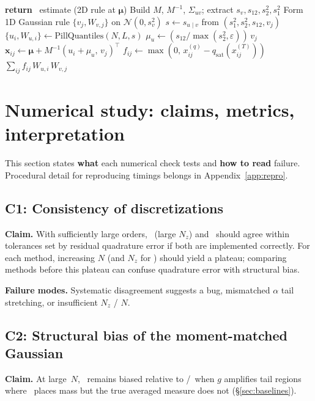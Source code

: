 \documentclass[11pt,a4paper]{article}
\begin{document}
\begin{algorithm}[H]
\caption{Profile--Rosenblatt quadrature for $\overline{q_c}$ (schematic)}
\label{alg:profros}
\begin{algorithmic}[1]
\IF{$\|\nabla\phi\|<\varepsilon$}
  \STATE \textbf{return} \centeronly\ estimate (2D rule at $\boldsymbol{\mu}$)
\ENDIF
\STATE Build $M$, $M^{-1}$, $\Sigma_{uv}$; extract $s_v,s_{12},s_2^2,s_1^2$
\STATE Form 1D Gaussian rule $\{v_j,W_{v,j}\}$ on $\mathcal{N}(0,s_v^2)$
  \STATE $s \gets s_{u\mid v}$ from $(s_1^2,s_2^2,s_{12},v_j)$
  \STATE $\{u_i,W_{u,i}\} \gets \mathrm{PillQuantiles}(N,L,s)$ 
  \STATE $\mu_u \gets (s_{12}/\max(s_2^2,\varepsilon))\,v_j$
    \STATE $\mathbf{x}_{ij}\gets \boldsymbol{\mu}+M^{-1}(u_i+\mu_u,\,v_j)^\top$
    \STATE $f_{ij}\gets \max(0,\,x^{(q)}_{ij}-q_{\mathrm{sat}}(x^{(T)}_{ij}))$
  \ENDFOR
\ENDFOR
\STATE \RETURN $\sum_{ij} f_{ij}\,W_{u,i}\,W_{v,j}$
\end{algorithmic}
\end{algorithm}

\section{Numerical study: claims, metrics, interpretation}
\label{sec:validation}

This section states \textbf{what} each numerical check tests and \textbf{how to read} failure.
Procedural detail for reproducing timings belongs in Appendix~\ref{app:repro}.

\subsection{C1: Consistency of discretizations}
\textbf{Claim.}
With sufficiently large orders, \columntensor\ (large $N_z$) and \profileros\ should agree within tolerances set by residual quadrature error if both are implemented correctly.
For each method, increasing $N$ (and $N_z$ for \columntensor) should yield a plateau; comparing methods before this plateau can confuse quadrature error with structural bias.

\textbf{Failure modes.}
Systematic disagreement suggests a bug, mismatched $\alpha$ tail stretching, or insufficient $N_z$ / $N$.

\subsection{C2: Structural bias of the moment-matched Gaussian}
\textbf{Claim.}
At large~$N$, \momentmatched\ remains biased relative to \columntensor/\profileros\ when $g$ amplifies tail regions where \momentmatched\ places mass but the true averaged measure does not (\S\ref{sec:baselines}).
\end{document}
